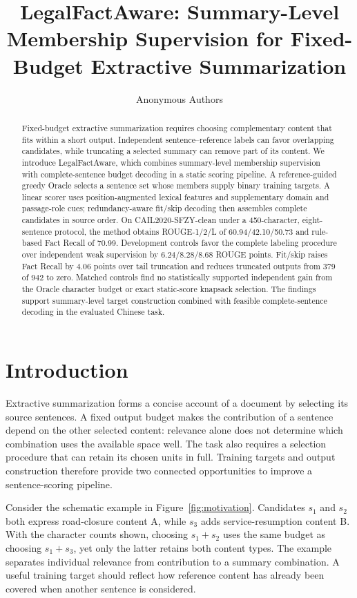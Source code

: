 \documentclass[10pt,twocolumn,letterpaper]{article}
\title{LegalFactAware: Summary-Level Membership Supervision for Fixed-Budget Extractive Summarization}
\author{Anonymous Authors}
\begin{document}
\maketitle


\begin{abstract}
Fixed-budget extractive summarization requires choosing complementary content that fits within a short output. Independent sentence--reference labels can favor overlapping candidates, while truncating a selected summary can remove part of its content. We introduce LegalFactAware, which combines summary-level membership supervision with complete-sentence budget decoding in a static scoring pipeline. A reference-guided greedy Oracle selects a sentence set whose members supply binary training targets. A linear scorer uses position-augmented lexical features and supplementary domain and passage-role cues; redundancy-aware fit/skip decoding then assembles complete candidates in source order. On CAIL2020-SFZY-clean under a 450-character, eight-sentence protocol, the method obtains ROUGE-1/2/L of 60.94/42.10/50.73 and rule-based Fact Recall of 70.99. Development controls favor the complete labeling procedure over independent weak supervision by 6.24/8.28/8.68 ROUGE points. Fit/skip raises Fact Recall by 4.06 points over tail truncation and reduces truncated outputs from 379 of 942 to zero. Matched controls find no statistically supported independent gain from the Oracle character budget or exact static-score knapsack selection. The findings support summary-level target construction combined with feasible complete-sentence decoding in the evaluated Chinese task.
\end{abstract}

\section{Introduction}\label{introduction}
Extractive summarization forms a concise account of a document by selecting its source sentences. A fixed output budget makes the contribution of a sentence depend on the other selected content: relevance alone does not determine which combination uses the available space well. The task also requires a selection procedure that can retain its chosen units in full. Training targets and output construction therefore provide two connected opportunities to improve a sentence-scoring pipeline.

Consider the schematic example in Figure~\ref{fig:motivation}. Candidates $s_1$ and $s_2$ both express road-closure content A, while $s_3$ adds service-resumption content B. With the character counts shown, choosing $s_1+s_2$ uses the same budget as choosing $s_1+s_3$, yet only the latter retains both content types. The example separates individual relevance from contribution to a summary combination. A useful training target should reflect how reference content has already been covered when another sentence is considered.
\end{document}
